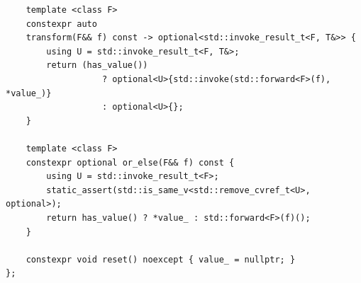 \documentclass[a4paper,10pt,oneside,openany,final,article]{memoir}
\begin{document}
\begin{verbatim}
    template <class F>
    constexpr auto
    transform(F&& f) const -> optional<std::invoke_result_t<F, T&>> {
        using U = std::invoke_result_t<F, T&>;
        return (has_value())
                   ? optional<U>{std::invoke(std::forward<F>(f), *value_)}
                   : optional<U>{};
    }

    template <class F>
    constexpr optional or_else(F&& f) const {
        using U = std::invoke_result_t<F>;
        static_assert(std::is_same_v<std::remove_cvref_t<U>, optional>);
        return has_value() ? *value_ : std::forward<F>(f)();
    }

    constexpr void reset() noexcept { value_ = nullptr; }
};
\end{verbatim}
\end{document}
